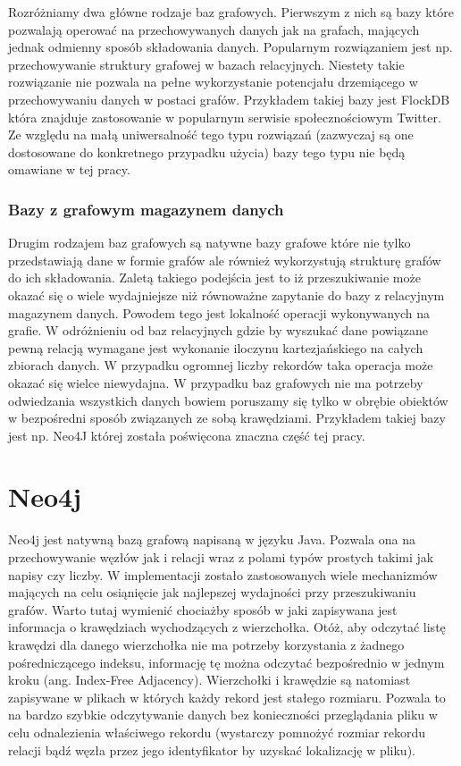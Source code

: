\documentclass[brudnopis]{xmgr}
\begin{document}
Rozróżniamy dwa główne rodzaje baz grafowych. Pierwszym z nich są bazy które pozwalają operować na przechowywanych danych jak na grafach, mających jednak odmienny sposób składowania danych. Popularnym rozwiązaniem jest np. przechowywanie struktury grafowej w bazach relacyjnych. Niestety takie rozwiązanie nie pozwala na pełne wykorzystanie potencjału drzemiącego w przechowywaniu danych w postaci grafów. Przykładem takiej bazy jest FlockDB która znajduje zastosowanie w popularnym serwisie społecznościowym Twitter. Ze względu na małą uniwersalność tego typu rozwiązań (zazwyczaj są one dostosowane do konkretnego przypadku użycia) bazy tego typu nie będą omawiane w tej pracy.

\subsection{Bazy z grafowym magazynem danych}
Drugim rodzajem baz grafowych są natywne bazy grafowe które nie tylko przedstawiają dane w formie grafów ale również wykorzystują strukturę grafów do ich składowania. Zaletą takiego podejścia jest to iż przeszukiwanie może okazać się o wiele wydajniejsze niż równoważne zapytanie do bazy z relacyjnym magazynem danych. Powodem tego jest lokalność operacji wykonywanych na grafie. W odróżnieniu od baz relacyjnych gdzie by wyszukać dane powiązane pewną relacją wymagane jest wykonanie iloczynu kartezjańskiego na całych zbiorach danych. W przypadku ogromnej liczby rekordów taka operacja może okazać się wielce niewydajna. W przypadku baz grafowych nie ma potrzeby odwiedzania wszystkich danych bowiem poruszamy się tylko w obrębie obiektów w bezpośredni sposób związanych ze sobą krawędziami. Przykładem takiej bazy jest np. Neo4J której została poświęcona znaczna część tej pracy.

\chapter{Neo4j}

Neo4j jest natywną bazą grafową napisaną w języku Java. Pozwala ona na przechowywanie węzłów jak i relacji wraz z polami typów prostych takimi jak napisy czy liczby. W implementacji zostało zastosowanych wiele mechanizmów mających na celu osiąnięcie jak najlepszej wydajności przy przeszukiwaniu grafów. Warto tutaj wymienić chociażby sposób w jaki zapisywana jest informacja o krawędziach wychodzących z wierzchołka. Otóż, aby odczytać listę krawędzi dla danego wierzchołka nie ma potrzeby korzystania z żadnego pośredniczącego indeksu, informację tę można odczytać bezpośrednio w jednym kroku (ang. Index-Free Adjacency). Wierzchołki i krawędzie są natomiast zapisywane w plikach w których każdy rekord jest stałego rozmiaru. Pozwala to na bardzo szybkie odczytywanie danych bez konieczności przeglądania pliku w celu odnalezienia właściwego rekordu (wystarczy pomnożyć rozmiar rekordu relacji bądź węzła przez jego identyfikator by uzyskać lokalizację w pliku).
\end{document}
